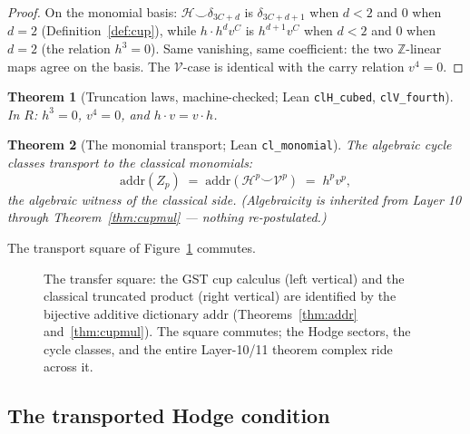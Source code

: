 \documentclass[11pt,a4paper]{article}
\theoremstyle{plain}
\newtheorem{theorem}{Theorem}[section]
\theoremstyle{definition}
\newcommand{\Z}{\mathbb{Z}}
\newcommand{\HC}{\mathcal{H}}
\newcommand{\VV}{\mathcal{V}}
\newcommand{\cycleClass}[1]{Z_{#1}}
\newcommand{\cupop}{\smile}
\begin{document}
\begin{proof}
On the monomial basis: $\HC \cupop \delta_{3C+d}$ is $\delta_{3C+d+1}$ when
$d < 2$ and $0$ when $d = 2$ (Definition~\ref{def:cup}), while
$h\cdot h^{d}v^{C}$ is $h^{d+1}v^{C}$ when $d<2$ and $0$ when $d = 2$
(the relation $h^{3}=0$). Same vanishing, same coefficient: the two
$\Z$-linear maps agree on the basis. The $\VV$-case is identical with the
carry relation $v^{4}=0$.
\end{proof}

\begin{theorem}[Truncation laws, machine-checked; Lean \texttt{clH\_cubed},
\texttt{clV\_fourth}]
\label{thm:trunc}
In $R$: $h^{3} = 0$, $v^{4} = 0$, and $h\cdot v = v \cdot h$.
\end{theorem}

\begin{theorem}[The monomial transport; Lean \texttt{cl\_monomial}]
The algebraic cycle classes transport to the classical monomials:
\[
  \mathrm{addr}(\cycleClass{p}) \;=\;
  \mathrm{addr}(\HC^{p}\cupop\VV^{p}) \;=\;
  h^{p}v^{p},
\]
the algebraic witness of the classical side. (Algebraicity is inherited from
Layer 10 through Theorem~\ref{thm:cupmul} --- nothing re-postulated.)
\end{theorem}

The transport square of Figure~\ref{fig:bridge} commutes.

\begin{figure}[t]
\centering
{}
\caption{The transfer square: the GST cup calculus (left vertical) and the
classical truncated product (right vertical) are identified by the
bijective additive dictionary $\mathrm{addr}$ (Theorems~\ref{thm:addr}
and~\ref{thm:cupmul}). The square commutes; the Hodge sectors, the cycle
classes, and the entire Layer-10/11 theorem complex ride across it.}
\label{fig:bridge}
\end{figure}

\subsection{The transported Hodge condition}
\end{document}
